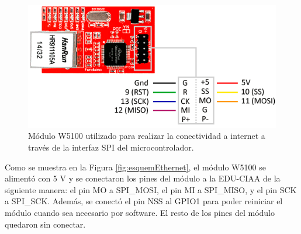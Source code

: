 \begin{figure}[H]
    \centering
    \includegraphics[width=0.7\linewidth]{Figuras/datalogger/Hardware/moduleW5100.png}
    \caption{Módulo W5100 utilizado para realizar la conectividad a internet a través de la interfaz SPI del microcontrolador.}
    \label{fig:moduleW5100}
\end{figure}

Como se muestra en la Figura \ref{fig:esquemEthernet}, el módulo W5100 se alimentó con 5 \unit{\volt} y se conectaron los pines del módulo a la EDU-CIAA de la siguiente manera: el pin MO a SPI\_MOSI, el pin MI a SPI\_MISO, y el pin SCK a SPI\_SCK. Además, se conectó el pin NSS al GPIO1 para poder reiniciar el módulo cuando sea necesario por software. El resto de los pines del módulo quedaron sin conectar.

